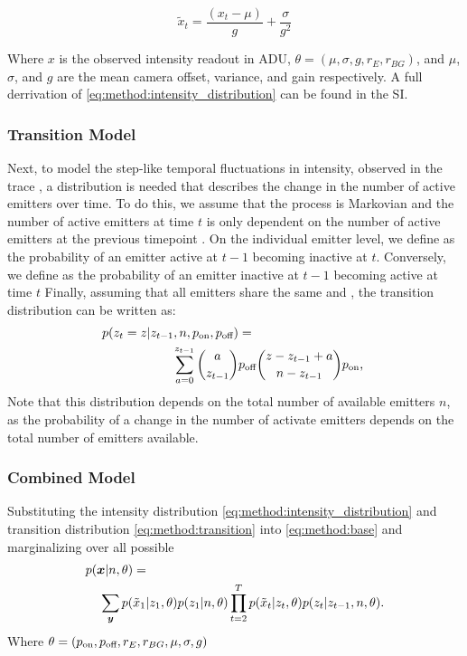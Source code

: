 \begin{equation*}
  \tilde{x}_{t} = \frac{(x_{t} - \mu)}{g} + \frac{\sigma}{g^{2}}
\end{equation*}


Where $x$ is the observed intensity readout in ADU, 
$\theta = (\mu, \sigma, g, r_{E}, r_{BG})$, and $\mu$, $\sigma$,
and $g$ are the mean camera offset, variance, and gain respectively.
%
A full derrivation of \eqref{eq:method:intensity_distribution} can be found in the SI.

\subsubsection{Transition Model}
Next, to model the step-like temporal fluctuations in intensity, observed in the trace \trace, 
a distribution is needed that describes the change in the number of active emitters \states over time. 
%
To do this, we assume that the process is Markovian and the number of active emitters  
at time $t$ is only dependent on the number of active emitters at the previous timepoint .
%
On the individual emitter level, we define \poff as the probability of an emitter active at $t-1$ becoming 
inactive at $t$. Conversely, we define \pon as the probability of an emitter inactive at $t-1$ becoming active at time $t$
%
Finally, assuming that all emitters share the same \poff and \pon, the transition distribution can be written as:
% 
\begin{align}
  \label{eq:method:transition}
  p(z_{t} = z | z_{t-1}, n, \pon, \poff) &=\\
	\sum_{a = 0}^{z_{t-1}}
    {a \choose z_{t-1}}
    &\poff
    {z - z_{t-1} + a \choose \n - z_{t-1}}
    \pon
    \text{,} \notag\
\end{align}
%
Note that this distribution depends on the total number of available emitters
$n$, as the probability of a change in the number of activate emitters
depends on the total number of emitters available.


\subsubsection{Combined Model}



Substituting the intensity distribution \eqref{eq:method:intensity_distribution} 
and transition distribution \eqref{eq:method:transition} 
into \eqref{eq:method:base} and marginalizing over all possible \states
% 
\begin{align}
  \label{eq:method:likelihood}
  p(\bm{x}|n,\theta) &=\\
    \sum_{\bm{y}}
      p(&\tilde{x}_{1}|z_{1}, \theta)
      p(z_{1}|n, \theta)
      \prod_{t=2}^{T}
        p(\tilde{x}_{t}|z_{t}, \theta)
        p(z_{t}|z_{t-1},n, \theta)
    \notag
  \text{.}
\end{align}
%
Where $\theta = (p_\text{on}, p_\text{off}, r_{E}, r_{BG}, \mu, \sigma, g)$

